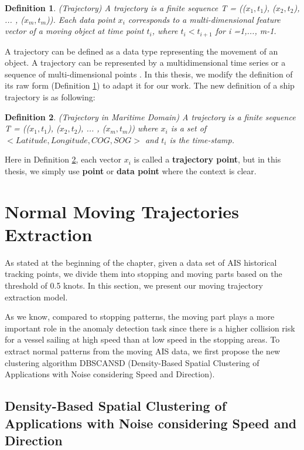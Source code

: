 \documentclass[12pt,glossary]{dalcsthesis}
\newtheorem{definition}{Definition}
\begin{document}
\begin{definition}
\label{def:trajectory_raw}
(Trajectory) A trajectory is a finite sequence T = (($x_1, t_1$), ($x_2, t_2$), ... , ($x_m, t_m$)). Each data point $x_i$ corresponds to a multi-dimensional feature vector of a moving object at time point $t_i$, where $t_i < t_{i+1}$ for i =1,..., m-1.
\end{definition}

A trajectory can be defined as a data type representing the movement of an object. A trajectory can be represented by a multidimensional time series \cite{aggarwal2013data} or a sequence of multi-dimensional points \cite{Lee07}. In this thesis, we modify the definition of its raw form (Definition \ref{def:trajectory_raw}) \cite{phdthesis} to adapt it for our work. The new definition of a ship trajectory is as following:

\begin{definition}
\label{def:trajectory}
(Trajectory in Maritime Domain) A trajectory is a finite sequence T = (($x_1, t_1$), ($x_2, t_2$), ... , ($x_m, t_m$)) where $x_i$ is a set of $<Latitude, Longitude, COG, SOG>$ and $t_i$ is the time-stamp.
\end{definition}

Here in Definition \ref{def:trajectory}, each vector $x_i$ is called a \textbf{trajectory point}, but in this thesis, we simply use \textbf{point} or \textbf{data point} where the context is clear.


\section{Normal Moving Trajectories Extraction}
\label{sec:normal_moving_model}


As stated at the beginning of the chapter, given a data set of AIS historical tracking points, we divide them into stopping and moving parts based on the threshold of 0.5 knots. In this section, we present our moving trajectory extraction model.

As we know, compared to stopping patterns, the moving part plays a more important role in the anomaly detection task since there is a higher collision risk for a vessel sailing at high speed than at low speed in the stopping areas. To extract normal patterns from the moving AIS data, we first propose the new clustering algorithm DBSCANSD (Density-Based Spatial Clustering of Applications with Noise considering Speed and Direction).

\subsection{Density-Based Spatial Clustering of Applications with Noise considering Speed and Direction}
\end{document}
